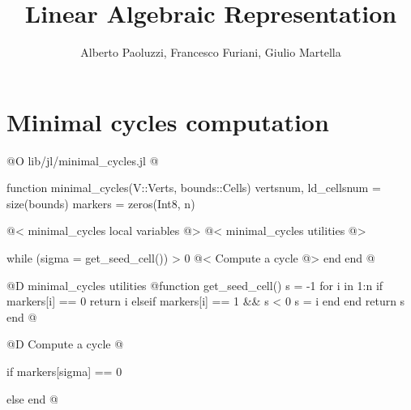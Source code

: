 \documentclass[10pt]{book}
\author{Alberto Paoluzzi, Francesco Furiani, Giulio Martella}
\title{Linear Algebraic Representation}
\begin{document}
\frontmatter
\maketitle
\tableofcontents





\mainmatter

\chapter{Minimal cycles computation}
\label{ch:minimal_cycles}

@O lib/jl/minimal_cycles.jl
@{function minimal_cycles(V::Verts, bounds::Cells)
    vertsnum, ld_cellsnum = size(bounds)
    markers = zeros(Int8, n)

    @< minimal\_cycles local variables @>
    @< minimal\_cycles utilities @>

    while (sigma = get_seed_cell()) > 0
        @< Compute a cycle @>
    end
end
@}


@D minimal\_cycles utilities
@{function get_seed_cell()
    s = -1
    for i in 1:n
        if markers[i] == 0
            return i
        elseif markers[i] == 1 && s < 0
            s = i
        end
    end
    return s
end
@}

@D Compute a cycle
@{if markers[sigma] == 0

else
end
@}


\backmatter


{}

\end{document}
